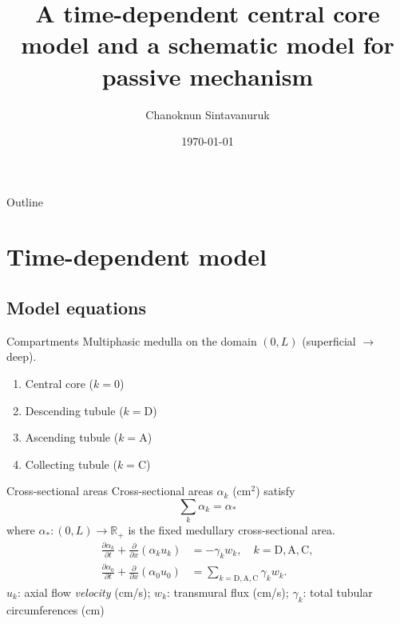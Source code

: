 \documentclass{beamer}
\title[]{A time-dependent central core model and a schematic model for passive mechanism}
\author[C. Sint]{Chanoknun Sintavanuruk 
}
\date{\today}
\begin{document}
\begin{frame}
    \titlepage 
\end{frame}

\begin{frame}{Outline}
    \tableofcontents
\end{frame}

\section{Time-dependent model}

\subsection{Model equations}

\begin{frame}{Compartments}
    Multiphasic medulla on the domain $(0,L)$ (superficial $\to$ deep).
    \begin{enumerate}
        \item Central core ($k=0$)
        \item Descending tubule ($k=\mathrm{D}$)
        \item Ascending tubule ($k=\mathrm{A}$)
        \item Collecting tubule ($k=\mathrm{C}$)
    \end{enumerate}
\end{frame}

\begin{frame}{Cross-sectional areas}
    Cross-sectional areas $\alpha_k$ ($\text{cm}^2$) satisfy
    \begin{equation}\label{eq:vol_conserv}
        \sum_k \alpha_k = \alpha_*
    \end{equation}
        where $\alpha_*:(0,L)\to \mathbb{R}_+$ is the fixed medullary cross-sectional area.
    \pause
    \begin{align}\label{eq:volume_dynamics}
        \frac{\partial \alpha_k}{\partial t} + \frac{\partial}{\partial x}\left( \alpha_k u_k \right) &= -\gamma_kw_k,\quad k=\mathrm{D},\mathrm{A},\mathrm{C},\\
        \frac{\partial \alpha_0}{\partial t} + \frac{\partial }{\partial x}\left( \alpha_0 u_0 \right) &= \sum_{k=\mathrm{D},\mathrm{A},\mathrm{C}} \gamma_kw_k.
    \end{align}
    $u_k$: axial flow \textit{velocity} (cm/s); $w_k$: transmural flux (cm/s); $\gamma_k$: total tubular circumferences (cm)
\end{frame}
\end{document}
